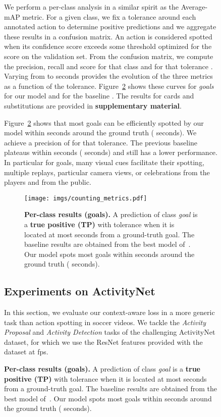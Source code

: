 \documentclass[10pt,twocolumn,letterpaper]{article}
\begin{document}
\begin{figure}[t]
{\begin{minipage}{\linewidth}
We perform a per-class analysis in a similar spirit as the Average-mAP metric. For a given class, we fix a tolerance  around each annotated action to determine positive predictions and we aggregate these results in a confusion matrix. An action is considered spotted when its confidence score exceeds some threshold optimized for the  score on the validation set. From the confusion matrix, we compute the precision, recall and  score for that class and for that tolerance . Varying  from  to  seconds provides the evolution of the three metrics as a function of the tolerance. Figure~\ref{fig:goalmetrics} shows these curves for \emph{goals} for our model and for the baseline \cite{Giancola_2018_CVPR_Workshops}. The results for cards and substitutions are provided in \textbf{supplementary material}.


Figure~\ref{fig:goalmetrics} shows that most goals can be efficiently spotted by our model within  seconds around the ground truth ( seconds). We achieve a precision of  for that tolerance. The previous baseline plateaus within  seconds ( seconds) and still has a lower performance. In particular for goals, many visual cues facilitate their spotting, \eg multiple replays, particular camera views, or celebrations from the players and from the public. 


\begin{figure}
    \centering
    \texttt{[image: imgs/counting\_metrics.pdf]}\\
    \caption{\textbf{Per-class results (goals).} A prediction of class \emph{goal} is a {\color{anthoblue}\textbf{true positive (TP)}} with tolerance  when it is located at most  seconds from a ground-truth goal. The baseline results are obtained from the best model of~\cite{Giancola_2018_CVPR_Workshops}. Our model spots most goals within  seconds around the ground truth ( seconds).
    }
    \label{fig:goalmetrics}
\end{figure}





\subsection{Experiments on ActivityNet}

In this section, we evaluate our context-aware loss in a more generic task than action spotting in soccer videos. We tackle the \emph{Activity Proposal} and \emph{Activity Detection} tasks of the challenging ActivityNet dataset, for which we use the ResNet features provided with the dataset at  fps. 



\end{minipage}}
\end{figure}
\end{document}
